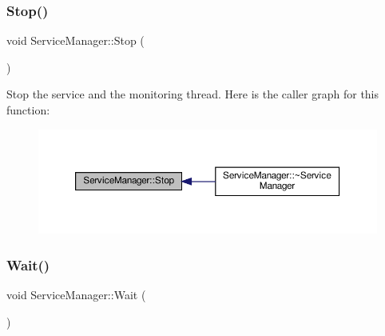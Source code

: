 \subsubsection{\texorpdfstring{Stop()}{Stop()}}
{\footnotesize\ttfamily void Service\+Manager\+::\+Stop (\begin{DoxyParamCaption}{ }\end{DoxyParamCaption})}

Stop the service and the monitoring thread. Here is the caller graph for this function\+:
\nopagebreak
\begin{figure}[H]
\begin{center}
\leavevmode
\includegraphics[width=350pt]{classServiceManager_abdeb5c08d4a1243f43477cda8109446a_icgraph}
\end{center}
\end{figure}
\mbox{\label{classServiceManager_abc19f11c2147855029dad4c4ce4de0d7}} 
\subsubsection{\texorpdfstring{Wait()}{Wait()}}
{\footnotesize\ttfamily void Service\+Manager\+::\+Wait (\begin{DoxyParamCaption}{ }\end{DoxyParamCaption})}

